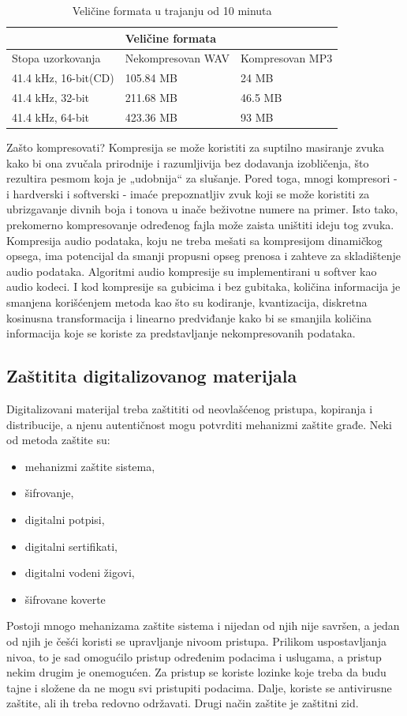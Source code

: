 \documentclass[a4paper]{article}
\begin{document}
    \begin{table}[ht]
    \centering    
    \begin{tabular}{lll} \hline
    & \textbf{Veličine formata} & \\ \hline
        Stopa uzorkovanja & Nekompresovan WAV & Kompresovan MP3 \\ \hline
        41.4 kHz, 16-bit(CD) & 105.84 MB & 24 MB \\ \hline
        41.4 kHz, 32-bit & 211.68 MB & 46.5 MB \\ \hline
        41.4 kHz, 64-bit & 423.36 MB & 93 MB
    \end{tabular}
    \caption{Veličine formata u trajanju od 10 minuta} 
    \label{Tab:tabela1}
    \end{table}


Zašto kompresovati?
Kompresija se može koristiti za suptilno masiranje zvuka kako bi ona zvučala prirodnije i razumljivija bez dodavanja izobličenja, što rezultira pesmom koja je „udobnija“ za slušanje. Pored toga, mnogi kompresori - i hardverski i softverski - imaće prepoznatljiv zvuk koji se može koristiti za ubrizgavanje divnih boja i tonova u inače beživotne numere na primer. Isto tako, prekomerno kompresovanje određenog fajla može zaista uništiti ideju tog zvuka. Kompresija audio podataka, koju ne treba mešati sa kompresijom dinamičkog opsega, ima potencijal da smanji propusni opseg prenosa i zahteve za skladištenje audio podataka. Algoritmi audio kompresije su implementirani u softver kao audio kodeci. I kod kompresije sa gubicima i bez gubitaka, količina informacija je smanjena korišćenjem metoda kao što su kodiranje, kvantizacija, diskretna kosinusna transformacija i linearno predviđanje kako bi se smanjila količina informacija koje se koriste za predstavljanje nekompresovanih podataka.    
\subsection{Zaštitita digitalizovanog materijala}   
Digitalizovani materijal treba zaštititi od neovlašćenog pristupa, kopiranja i
distribucije, a njenu autentičnost mogu potvrditi mehanizmi zaštite građe. Neki
od metoda zaštite su:
\begin{itemize}
    \item mehanizmi zaštite sistema,
    \item  šifrovanje,
    \item  digitalni potpisi,
    \item  digitalni sertifikati,
    \item  digitalni vodeni žigovi,
    \item  šifrovane koverte 
\end{itemize}
Postoji mnogo mehanizama zaštite sistema i nijedan od njih nije savršen, a jedan od njih je češći
koristi se upravljanje nivoom pristupa. Prilikom uspostavljanja nivoa, to je sad omogućilo
pristup određenim podacima i uslugama, a pristup  nekim drugim je onemogućen. Za pristup se koriste lozinke koje treba da budu tajne i složene da ne mogu svi pristupiti podacima. Dalje, koriste se antivirusne zaštite, ali ih treba redovno održavati. Drugi način zaštite je zaštitni zid.
\end{document}

